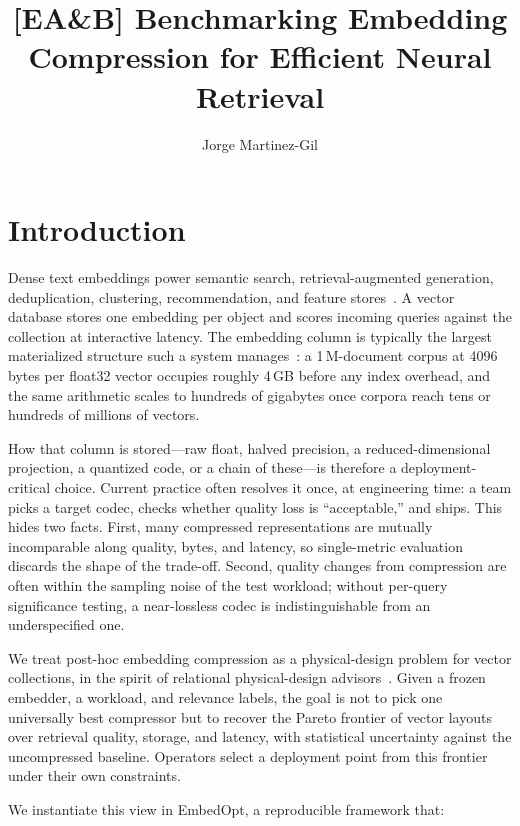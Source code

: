 \documentclass[sigconf]{acmart}
\title{[EA\&B] Benchmarking Embedding Compression for Efficient Neural Retrieval}
\author{Jorge Martinez-Gil}
\affiliation{%
  \institution{Software Competence Center Hagenberg GmbH}
  \city{Hagenberg}
  \postcode{4232}
  \country{Austria}}
\newcommand{\method}{EmbedOpt}
\begin{document}
\maketitle
\pagestyle{plain}

\section{Introduction}
\label{sec:intro}

Dense text embeddings power semantic search, retrieval-augmented generation, deduplication, clustering, recommendation, and feature stores~\cite{karpukhin2020dpr,lewis2020rag,reimers2019sbert}. A vector database stores one embedding per object and scores incoming queries against the collection at interactive latency. The embedding column is typically the largest materialized structure such a system manages~\cite{pan2024vectordb,zilliztech2021milvus}: a 1\,M-document corpus at 4096 bytes per float32 vector occupies roughly 4\,GB before any index overhead, and the same arithmetic scales to hundreds of gigabytes once corpora reach tens or hundreds of millions of vectors.

How that column is stored---raw float, halved precision, a reduced-dimensional projection, a quantized code, or a chain of these---is therefore a deployment-critical choice. Current practice often resolves it once, at engineering time: a team picks a target codec, checks whether quality loss is ``acceptable,'' and ships. This hides two facts. First, many compressed representations are mutually incomparable along quality, bytes, and latency, so single-metric evaluation discards the shape of the trade-off. Second, quality changes from compression are often within the sampling noise of the test workload; without per-query significance testing, a near-lossless codec is indistinguishable from an underspecified one.

We treat post-hoc embedding compression as a physical-design problem for vector collections, in the spirit of relational physical-design advisors~\cite{chaudhuri1997self,agrawal2004autoadmin}. Given a frozen embedder, a workload, and relevance labels, the goal is not to pick one universally best compressor but to recover the Pareto frontier of vector layouts over retrieval quality, storage, and latency, with statistical uncertainty against the uncompressed baseline. Operators select a deployment point from this frontier under their own constraints.

We instantiate this view in \method{}, a reproducible framework that:
\end{document}

